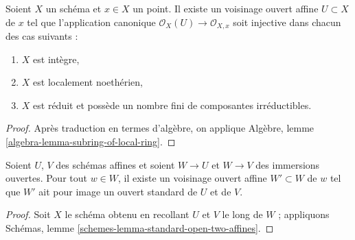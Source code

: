 \begin{lemma}
\label{lemma-ring-affine-open-injective-local-ring}
Soient $X$ un schéma et $x \in X$ un point. Il existe un voisinage ouvert
affine $U \subset X$ de $x$ tel que l'application canonique
$\mathcal{O}_X(U) \to \mathcal{O}_{X, x}$ soit injective dans chacun
des cas suivants :
\begin{enumerate}
\item $X$ est intègre,
\item $X$ est localement noethérien,
\item $X$ est réduit et possède un nombre fini de composantes irréductibles.
\end{enumerate}
\end{lemma}

\begin{proof}
Après traduction en termes d'algèbre, on applique
Algèbre, lemme \ref{algebra-lemma-subring-of-local-ring}.
\end{proof}

\begin{lemma}
\label{lemma-standard-open-two-affines}
Soient $U$, $V$ des schémas affines et soient $W \to U$ et $W \to V$
des immersions ouvertes. Pour tout $w \in W$, il existe un voisinage ouvert
affine $W' \subset W$ de $w$ tel que $W'$
ait pour image un ouvert standard de $U$ et de $V$.
\end{lemma}

\begin{proof}
Soit $X$ le schéma obtenu en recollant $U$ et $V$ le long de $W$ ;
appliquons Schémas, lemme \ref{schemes-lemma-standard-open-two-affines}.
\end{proof}












